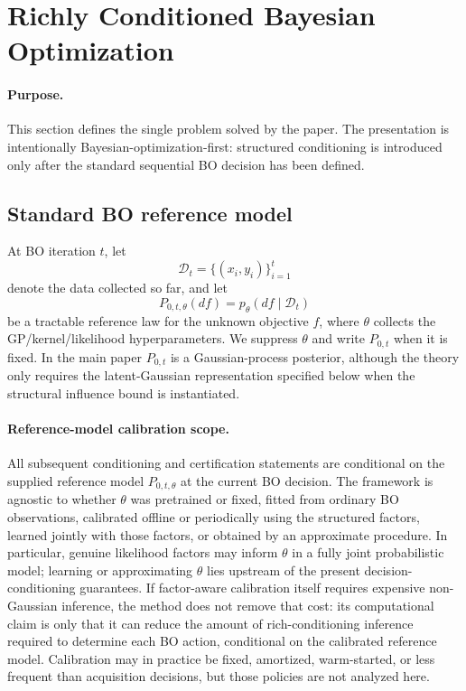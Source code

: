 
\section{Richly Conditioned Bayesian Optimization}
\label{sec:problem}

\paragraph{Purpose.}
This section defines the single problem solved by the paper.  The presentation is
intentionally Bayesian-optimization-first: structured conditioning is introduced
only after the standard sequential BO decision has been defined.

\subsection{Standard BO reference model}

At BO iteration $t$, let
\[
    \mathcal D_t = \{(x_i,y_i)\}_{i=1}^t
\]
denote the data collected so far, and let
\[
    P_{0,t,\theta}(df) = p_\theta(df\mid \mathcal D_t)
\]
be a tractable reference law for the unknown objective $f$, where $\theta$
collects the GP/kernel/likelihood hyperparameters.  We suppress $\theta$ and
write $P_{0,t}$ when it is fixed.  In the main paper
$P_{0,t}$ is a Gaussian-process posterior, although the theory only requires the
latent-Gaussian representation specified below when the structural influence
bound is instantiated.

\paragraph{Reference-model calibration scope.}
All subsequent conditioning and certification statements are conditional on
the supplied reference model $P_{0,t,\theta}$ at the current BO decision.  The
framework is agnostic to whether $\theta$ was pretrained or fixed, fitted from
ordinary BO observations, calibrated offline or periodically using the
structured factors, learned jointly with those factors, or obtained by an
approximate procedure.  In particular, genuine likelihood factors may inform
$\theta$ in a fully joint probabilistic model; learning or approximating
$\theta$ lies upstream of the present decision-conditioning guarantees.  If
factor-aware calibration itself requires expensive non-Gaussian inference, the
method does not remove that cost: its computational claim is only that it can
reduce the amount of rich-conditioning inference required to determine each BO
action, conditional on the calibrated reference model.  Calibration may in
practice be fixed, amortized, warm-started, or less frequent than acquisition
decisions, but those policies are not analyzed here.

